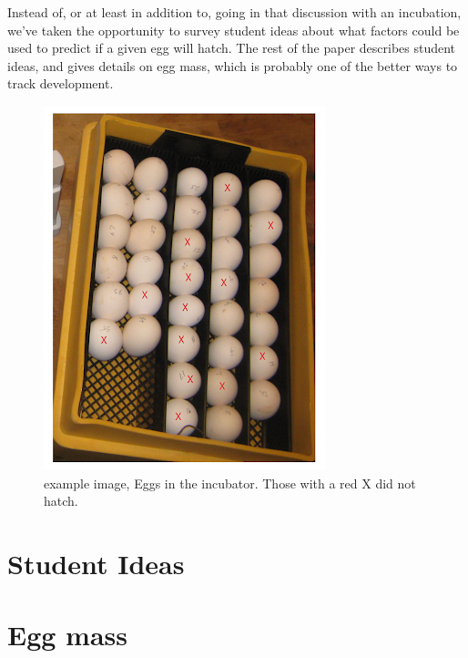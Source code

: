 \documentclass[prb,preprint]{revtex4-2}
\begin{document}
Instead of, or at least in addition to, going in that discussion with an incubation, we've taken the opportunity to survey student ideas about what factors could be used to predict if a given egg will hatch.  The rest of the paper describes student ideas, and gives details on egg mass, which is probably one of the better ways to track development.  
    
\begin{figure}[h]
\centering
\includegraphics[width=\columnwidth]{did_not_hatch.png}
\caption{
example image, Eggs in the incubator.  Those with a red X did not hatch.
}
\label{incubator}
\end{figure}

\section{Student Ideas}


\section{Egg mass}
\end{document}
